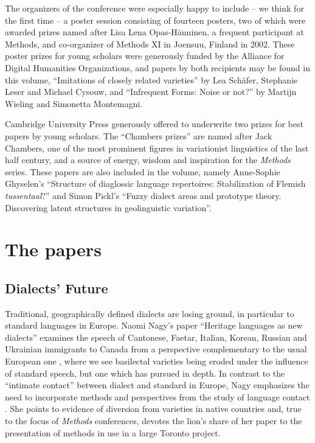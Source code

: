 \documentclass[output=paper]{LSP/langsci}
\begin{document}
The organizers of the conference were especially happy to include – we think for the first time – a poster session consisting of fourteen posters, two of which were awarded prizes named after Lisa Lena Opas-Hänninen, a frequent participant at Methods, and co-organizer of Methods XI in Joensuu, Finland in 2002.  These poster prizes for young scholars were generously funded by the Alliance for Digital Humanities Organizations, and papers by both recipients may be found in this volume, “Imitations of closely related varieties” by Lea Schäfer, Stephanie Leser and Michael Cysouw, and “Infrequent Forms: Noise or not?” by Martijn Wieling and Simonetta Montemagni.

Cambridge University Press generously offered to underwrite two prizes for best papers by young scholars.  The “Chambers prizes” are named after Jack Chambers, one of the most prominent figures in variationist linguistics of the last half century, and a source of energy, wisdom and inspiration for the \textit{Methods} series.  These papers are also included in the volume, namely Anne-Sophie Ghyselen’s “Structure of diaglossic language repertoires: Stabilization of Flemish \textit{tussentaal}?” and Simon Pickl’s “Fuzzy dialect areas and prototype theory.  Discovering latent structures in geolinguistic variation”.

\section{The papers}
\subsection{Dialects’ Future}

Traditional, geographically defined dialects are losing ground, in particular to standard languages in Europe. Naomi Nagy’s paper “Heritage languages as new dialects” examines the speech of Cantonese, Faetar, Italian, Korean, Russian and Ukrainian immigrants to Canada from a perspective complementary to the usual European one \citep{auer_dialect_2004}, where we see basilectal varieties being eroded under the influence of standard speech, but one which \citet{trudgill_new-dialect_2004} has pursued in depth.  In contrast to the “intimate contact” between dialect and standard in Europe, Nagy emphasizes the need to incorporate methods and perspectives from the study of language contact \citep{hickey_handbook_2010}. She points to evidence of diversion from varieties in native countries and, true to the focus of \textit{Methods} conferences, devotes the lion’s share of her paper to the presentation of methods in use in a large Toronto project.
\end{document}
